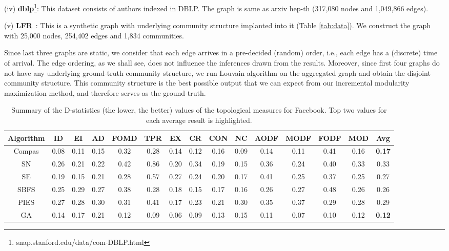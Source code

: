 (iv) {\bf dblp}\footnote{snap.stanford.edu/data/com-DBLP.html}:
This dataset consists of authors indexed in DBLP. The graph is same as arxiv hep-th (317,080 nodes and 1,049,866 edges).

(v) {\bf LFR}~\cite{lancichinetti2008benchmark}: This is a synthetic graph with underlying community structure implanted into it (Table \ref{tab:data}).
We construct the graph with 25,000 nodes, 254,402 edges and 1,834 communities.

Since last three graphs are static, we consider that each edge arrives in a pre-decided (random) order, i.e., each edge has a (discrete) time of arrival. 
The edge ordering, as we shall see, does not influence the inferences drawn from the results.
Moreover, since first four graphs do not have any underlying ground-truth community structure, we run Louvain algorithm %
on the aggregated graph and obtain the disjoint community structure. This community structure is the best possible output that we can expect from our incremental modularity maximization method, and therefore serves as the ground-truth. 


\begin{table}
\centering
\caption{Summary of the D-statistics (the lower, the better) values of the topological measures for Facebook. Top two values for each average result is highlighted.}
\label{tab_fb}
\begin{adjustbox}{max width=\textwidth}
\begin{tabular}{c|c c c c c c c c c c c c c |c}
\hline
Algorithm & ID & EI & AD & FOMD & TPR & EX & CR & CON & NC & AODF & MODF & FODF & MOD & Avg \\ \hline
Compas    & 0.08   & 0.11   & 0.15   & 0.32     & 0.28    & 0.14   & 0.12   & 0.16    & 0.09   & 0.14     & 0.11     & 0.41     & 0.16 & {\bf 0.17}   \\ 
SN        & 0.26         &  0.21   & 0.22   & 0.42     & 0.86    & 0.20   & 0.34   & 0.19    & 0.15   &  0.36    & 0.24     & 0.40     & 0.33 & 0.33    \\ 
SE        & 0.19         &  0.15   & 0.21   & 0.28     & 0.57    & 0.27   & 0.24   & 0.20    & 0.17   & 0.41     & 0.25     & 0.37     & 0.25 & 0.27   \\ 
SBFS      &  0.25        &  0.29   & 0.27   & 0.38     & 0.28    & 0.18   & 0.15   & 0.17    & 0.16   & 0.26     & 0.27     & 0.48     &  0.26 & 0.26   \\ 
PIES      & 0.27         &  0.28  & 0.30   & 0.31     & 0.41    & 0.17   &  0.23  &  0.21   &  0.30  & 0.35     & 0.37     &  0.29    & 0.28 & 0.29   \\ 
GA        & 0.14   &  0.17   &  0.21   & 0.12     &  0.09   &  0.06  & 0.09   &  0.13    & 0.15   & 0.11     &  0.07      & 0.10   & 0.12 & {\bf 0.12} \\ \hline
\end{tabular}
\end{adjustbox}
\vspace{3mm}
\end{table}


